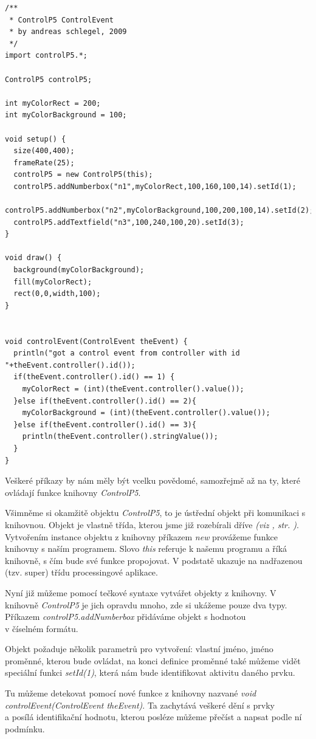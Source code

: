 \documentclass[10pt,twoside=true,open=right,cleardoublepage=empty,chapterprefix=true]{scrbook}
\newcommand{\vyraz}[1]{\textit{\gls{#1}}\index{#1}\label{#1}}
\newcommand{\odkaz}[1]{\textit{(viz \nameref{#1}, str. \pageref*{#1})}}
\begin{document}
 
\begin{lstlisting}
/**
 * ControlP5 ControlEvent
 * by andreas schlegel, 2009
 */
import controlP5.*;

ControlP5 controlP5;

int myColorRect = 200;
int myColorBackground = 100;

void setup() {
  size(400,400);
  frameRate(25);
  controlP5 = new ControlP5(this);
  controlP5.addNumberbox("n1",myColorRect,100,160,100,14).setId(1);
  controlP5.addNumberbox("n2",myColorBackground,100,200,100,14).setId(2);
  controlP5.addTextfield("n3",100,240,100,20).setId(3);
}

void draw() {
  background(myColorBackground);
  fill(myColorRect);
  rect(0,0,width,100);
}


void controlEvent(ControlEvent theEvent) {
  println("got a control event from controller with id "+theEvent.controller().id());
  if(theEvent.controller().id() == 1) {
    myColorRect = (int)(theEvent.controller().value());
  }else if(theEvent.controller().id() == 2){
    myColorBackground = (int)(theEvent.controller().value());
  }else if(theEvent.controller().id() == 3){
    println(theEvent.controller().stringValue());
  }
}
\end{lstlisting}

Veškeré příkazy by nám měly být vcelku povědomé, samozřejmě až na ty, které ovládají funkce knihovny {\em ControlP5}.

Všimněme si okamžitě objektu {\em ControlP5}, to je ústřední objekt při komunikaci s knihovnou. Objekt je vlastně třída, kterou jsme již rozebírali dříve \odkaz{Třída a objekt}. Vytvořením instance objektu z knihovny příkazem \vyraz{new} provážeme funkce knihovny s naším programem. Slovo \vyraz{this} referuje k našemu programu a říká knihovně, s čím bude své funkce propojovat. V podstatě ukazuje na nadřazenou (tzv. super) třídu processingové aplikace.

 Nyní již můžeme pomocí tečkové syntaxe vytvářet objekty z knihovny. V knihovně {\em ControlP5} je jich opravdu mnoho, zde si ukážeme pouze dva typy.  Příkazem {\em controlP5.addNumberbox} přidáváme objekt s hodnotou \\ v číselném formátu.
 
Objekt požaduje několik parametrů pro vytvoření: vlastní jméno, jméno proměnné, kterou bude ovládat, na konci definice proměnné také můžeme vidět speciální funkci  {\em setId(1)}, která nám bude identifikovat aktivitu daného prvku.

Tu můžeme detekovat pomocí nové funkce z knihovny nazvané {\em void controlEvent(ControlEvent theEvent)}. Ta zachytává veškeré dění s prvky \\a posílá identifikační hodnotu, kterou posléze můžeme přečíst a napsat podle ní podmínku.
\end{document}
